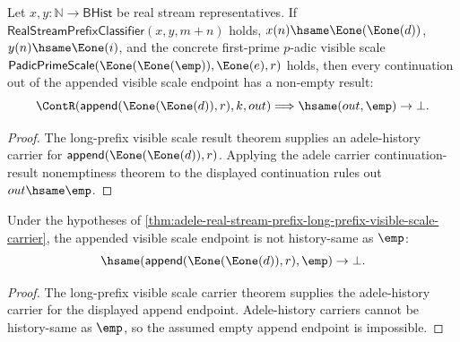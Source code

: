 \begin{theorem}
\label{thm:adele-real-stream-prefix-long-prefix-visible-scale-cont-result-nonempty}
Let $x,y:\mathbb{N}\to\mathsf{BHist}$ be real stream representatives. If
$\mathsf{RealStreamPrefixClassifier}(x,y,m+n)$ holds, $x(n)\hsame
\Eone(\Eone(d))$, $y(n)\hsame\Eone(i)$, and the concrete first-prime
$p$-adic visible scale
$\mathsf{PadicPrimeScale}(\Eone(\Eone(\emp)),\Eone(e),r)$ holds, then every
continuation out of the appended visible scale endpoint has a non-empty
result:
$$
\ContR(\mathsf{append}(\Eone(\Eone(d)),r),k,out)
\Longrightarrow
\hsame(out,\emp)\to\bot.
$$
\end{theorem}
\begin{proof}
The long-prefix visible scale result theorem supplies an adele-history carrier
for $\mathsf{append}(\Eone(\Eone(d)),r)$. Applying the adele carrier
continuation-result nonemptiness theorem to the displayed continuation rules
out $out\hsame\emp$.
\end{proof}

\begin{theorem}
\label{thm:adele-real-stream-prefix-long-prefix-visible-scale-append-not-empty}
Under the hypotheses of \autoref{thm:adele-real-stream-prefix-long-prefix-visible-scale-carrier}, the appended visible scale endpoint is not history-same as $\emp$:
$$
\hsame(\mathsf{append}(\Eone(\Eone(d)),r),\emp)\to\bot.
$$
\end{theorem}
\begin{proof}
The long-prefix visible scale carrier theorem supplies the adele-history carrier
for the displayed append endpoint. Adele-history carriers cannot be
history-same as $\emp$, so the assumed empty append endpoint is impossible.
\end{proof}

